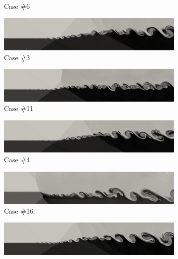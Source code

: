\documentclass[conf]{new-aiaa}
\begin{document}
\begin{figure}[!ht]
\begin{subfigure}{.48\textwidth}
\caption{Case \#6}
\label{fig:mach6}
\end{subfigure}
\begin{subfigure}{.48\textwidth}
\includegraphics[width=0.99\columnwidth]{figs/mach-3-crop.png}
\caption{Case \#3}
\label{fig:mach3}
\end{subfigure}
\begin{subfigure}{.48\textwidth}
\includegraphics[width=0.99\columnwidth]{figs/mach-11-crop.png}
\caption{Case \#11}
\label{fig:mach11}
\end{subfigure}
\begin{subfigure}{.48\textwidth}
\includegraphics[width=0.99\columnwidth]{figs/mach-4-crop.png}
\caption{Case \#4}
\label{fig:mach4}
\end{subfigure}
\begin{subfigure}{.48\textwidth}
\includegraphics[width=0.99\columnwidth]{figs/mach-16-crop.png}
\caption{Case \#16}
\label{fig:mach1}
\end{subfigure}
\begin{subfigure}{.48\textwidth}
\includegraphics[width=0.99\columnwidth]{figs/mach-5-crop.png}

\end{subfigure}
\end{figure}
\end{document}
